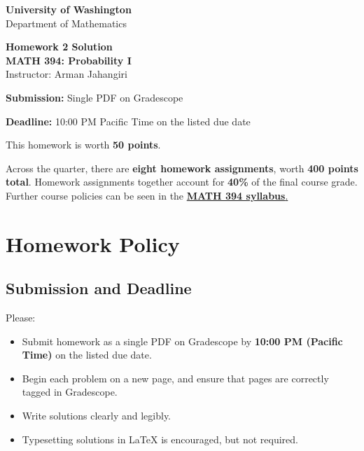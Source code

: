 \documentclass[11pt]{article}
\newcommand{\course}{MATH 394: Probability I}
\newcommand{\department}{Department of Mathematics}
\newcommand{\university}{University of Washington}
\begin{document}
\begin{titlepage}
\centering
\vspace*{1.2cm}

{\Large \textbf{\university}}\\
{\large \department}

\vspace{1.5cm}

{\Huge \color{uwpurple}\textbf{Homework 2 Solution}}\\[0.25cm]
{\Large \textbf{\course}}\\[0.25cm]
{\large Instructor: Arman Jahangiri}

\vspace{1cm}

\begin{tcolorbox}[
    width=0.78\textwidth,
    colback=softpurple,
    colframe=uwpurple,
    boxrule=0.9pt,
    arc=3mm
]
\centering
\textbf{Submission:} Single PDF on Gradescope

\textbf{Deadline:} 10:00 PM Pacific Time on the listed due date
\end{tcolorbox}

\vspace{0.8cm}

\begin{tcolorbox}[
    width=0.86\textwidth,
    colback=white,
    colframe=uwgold,
    boxrule=0.8pt,
    arc=3mm
]
This homework is worth \textbf{50 points}.

Across the quarter, there are \textbf{eight homework assignments}, worth \textbf{400 points total}. Homework assignments together account for \textbf{40\%} of the final course grade. Further course policies can be seen in the \href{https://armanjg.github.io/MATH-394-Probability-1-v2/}{\textbf{MATH 394 syllabus}.}
\end{tcolorbox}

\vfill
\end{titlepage}

\section*{Homework Policy}

\subsection*{Submission and Deadline}

Please:

\begin{itemize}[leftmargin=*]
    \item Submit homework as a single PDF on Gradescope by \textbf{10:00 PM (Pacific Time)} on the listed due date.
    \item Begin each problem on a new page, and ensure that pages are correctly tagged in Gradescope.
    \item Write solutions clearly and legibly.
    \item Typesetting solutions in LaTeX is encouraged, but not required.
\end{itemize}
\end{document}
